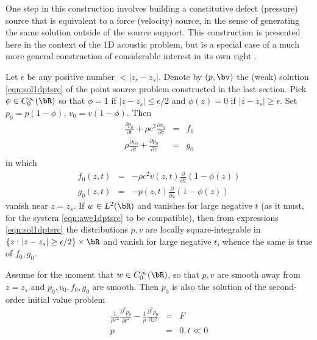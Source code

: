 One step in this construction involves building a constitutive defect
(pressure) source that is equivalent to a force (velocity) source, in the sense of generating the
same solution outside of the source support. This construction is
presented here in the context of the 1D acoustic problem, but is a
special case of a much more general construction of considerable
interest in its own right \cite[]{BurridgeKnopoff:64}.

Let
$\epsilon$ be any positive number $<|z_r-z_s|$. 
Denote by $(p,\bv)$ the (weak) solution \ref{eqn:sol1dptsrc} of the point source
problem constructed in the last section.
Pick $\phi \in C_0^{\infty}(\bR)$ so that
$\phi = 1$ if $|z-z_s| \le \epsilon/2$ and $\phi(z)=0$ if $|z-z_s|
\ge\epsilon$. Set $p_0=p(1-\phi)$, $v_0=v(1-\phi)$. Then
\begin{eqnarray}
\label{eqn:awecut}
\frac{\partial p_0}{\partial t} + \rho c^2 \frac{\partial
  v_0}{\partial z} &=&
                            f_0  \nonumber\\
\rho \frac{\partial v_0}{\partial t} +\frac{\partial p_0}{\partial z} &=& g_0 \nonumber\\
\end{eqnarray}
in which
\begin{eqnarray}
  \label{eqn:rhscut}
  f_0(z,t) &=& -\rho c^2 v(z,t) \frac{\partial}{\partial z}(1-\phi(z))\nonumber\\
  g_0(z,t) &=& -p(z,t) \frac{\partial}{\partial z}(1-\phi(z))
\end{eqnarray}
vanish near $z=z_s$. If $w \in L^2(\bR)$ and vanishes for large
negative $t$ (as it must, for the system \ref{eqn:awe1dptsrc} to be
compatible), then from expressions \ref{eqn:sol1dptsrc} the
distributions $p,v$ are locally square-integrable in
$\{z:|z-z_s| \ge \epsilon/2\} \times \bR$ and vanish for large
negative $t$, whence the same is true of $f_0,g_0$.

Assume for the moment that $w \in C^{\infty}_0(\bR)$, so that $p,v$
are smooth away from $z=z_s$ and $p_0, v_0, f_0, g_0$ are smooth. Then
$p_0$ is also the solution of the second-order initial value problem
\begin{eqnarray}
  \label{eqn:awe2ord}
  \frac{1}{\rho c^2} \frac{\partial^2 p_0}{\partial t^2} -
  \frac{1}{\rho}\frac{\partial^2 p_0}{\partial z^2} &=& F\nonumber \\
  p &=& 0, t\ll 0
\end{eqnarray}
   
